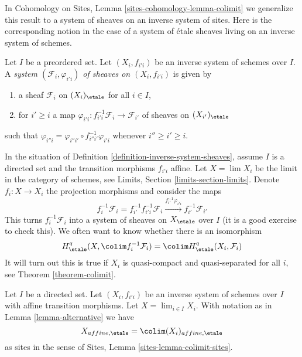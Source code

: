 \medskip\noindent
In Cohomology on Sites, Lemma \ref{sites-cohomology-lemma-colimit}
we generalize this result to a system of sheaves
on an inverse system of sites. Here is the corresponding
notion in the case of a system of \'etale sheaves living
on an inverse system of schemes.

\begin{definition}
\label{definition-inverse-system-sheaves}
Let $I$ be a preordered set. Let $(X_i, f_{i'i})$ be an inverse
system of schemes over $I$.
A {\it system $(\mathcal{F}_i, \varphi_{i'i})$ of sheaves
on $(X_i, f_{i'i})$} is given by
\begin{enumerate}
\item a sheaf $\mathcal{F}_i$ on $(X_i)_\etale$ for all $i \in I$,
\item for $i' \geq i$ a map
$\varphi_{i'i} : f_{i'i}^{-1}\mathcal{F}_i \to \mathcal{F}_{i'}$
of sheaves on $(X_{i'})_\etale$
\end{enumerate}
such that $\varphi_{i''i} = \varphi_{i''i'} \circ f_{i'' i'}^{-1}\varphi_{i'i}$
whenever $i'' \geq i' \geq i$.
\end{definition}

\noindent
In the situation of Definition \ref{definition-inverse-system-sheaves},
assume $I$ is a directed set and the transition morphisms $f_{i'i}$ affine.
Let $X = \lim X_i$ be the limit in the category of schemes, see
Limits, Section \ref{limits-section-limits}.
Denote $f_i : X \to X_i$ the projection morphisms and consider the maps
$$
f_i^{-1}\mathcal{F}_i = f_{i'}^{-1}f_{i'i}^{-1}\mathcal{F}_i
\xrightarrow{f_{i'}^{-1}\varphi_{i'i}}
f_{i'}^{-1}\mathcal{F}_{i'}
$$
This turns $f_i^{-1}\mathcal{F}_i$ into a system of sheaves on $X_\etale$
over $I$ (it is a good exercise to check this).
We often want to know whether there is an isomorphism
$$
H^q_\etale(X, \colim f_i^{-1}\mathcal{F}_i) =
\colim H^q_\etale(X_i, \mathcal{F}_i)
$$
It will turn out this is true if $X_i$ is quasi-compact and quasi-separated
for all $i$, see Theorem \ref{theorem-colimit}.

\begin{lemma}
\label{lemma-colimit-affine-sites}
Let $I$ be a directed set. Let $(X_i, f_{i'i})$ be an inverse
system of schemes over $I$ with affine transition morphisms.
Let $X = \lim_{i \in I} X_i$. With
notation as in Lemma \ref{lemma-alternative} we have
$$
X_{affine, \etale} = \colim (X_i)_{affine, \etale}
$$
as sites in the sense of
Sites, Lemma \ref{sites-lemma-colimit-sites}.
\end{lemma}

